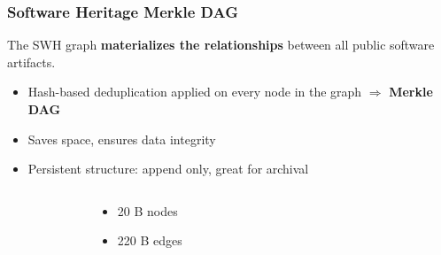 \documentclass[aspectratio=169,xcolor=table]{beamer}
\begin{document}
    \begin{frame}
        \frametitle{Software Heritage Merkle DAG}
        \begin{block}{}
            The SWH graph \textbf{materializes the relationships} between
            all public software artifacts.

            \begin{itemize}
                \item Hash-based deduplication applied on every node in the
                    graph $\Rightarrow$ \textbf{Merkle DAG}
                \item Saves space, ensures data integrity
                \item Persistent structure: append only, great for archival
            \end{itemize}
        \end{block}
        \vfill
        \begin{columns}
            \hfill
            \begin{figure}
                \centering
                \scalebox{0.6}{}
            \end{figure}
            \begin{block}{}
                \begin{itemize}
                    \item 20 B nodes
                    \item 220 B edges
                \end{itemize}
            \end{block}
        \end{columns}

    \end{frame}


\end{document}
